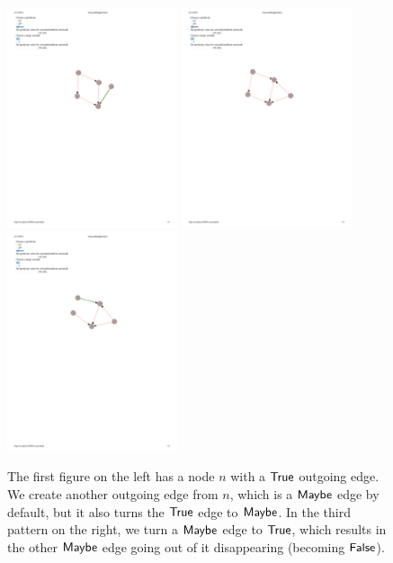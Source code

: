 \begin{figure}
  \centering
  \includegraphics[width=5cm]{fig/edges3.pdf}
  \includegraphics[width=5cm]{fig/edge-constraints-1.pdf}
  \includegraphics[width=5cm]{fig/edge-constraints-2.pdf}
  \caption{The first figure on the left has a node $n$ with a $\mathsf{True}$ outgoing edge. We create another outgoing edge from $n$, which is a $\mathsf{Maybe}$ edge by default, but it also turns the $\mathsf{True}$ edge to $\mathsf{Maybe}$. In the third pattern on the right, we turn a $\mathsf{Maybe}$ edge to $\mathsf{True}$, which results in the other $\mathsf{Maybe}$ edge going out of it disappearing (becoming $\mathsf{False}$).}
  \label{fig:edge-constraints}
\end{figure}

